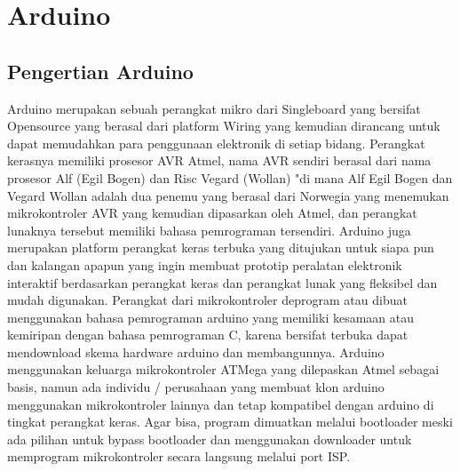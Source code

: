\section{Arduino}
\subsection{Pengertian Arduino}
Arduino merupakan sebuah perangkat mikro dari Singleboard yang bersifat Opensource yang berasal dari platform Wiring yang kemudian dirancang untuk dapat memudahkan para penggunaan elektronik di setiap bidang. Perangkat kerasnya memiliki prosesor AVR Atmel, nama AVR sendiri berasal dari nama prosesor Alf (Egil Bogen) dan Risc Vegard (Wollan) "di mana Alf Egil Bogen dan Vegard Wollan adalah dua penemu yang berasal dari Norwegia yang menemukan mikrokontroler AVR yang kemudian dipasarkan oleh Atmel, dan perangkat lunaknya tersebut memiliki bahasa pemrograman tersendiri. 
Arduino juga merupakan platform perangkat keras terbuka yang ditujukan untuk siapa pun dan kalangan apapun yang ingin membuat prototip peralatan elektronik interaktif berdasarkan perangkat keras dan perangkat lunak yang fleksibel dan mudah digunakan. Perangkat dari mikrokontroler deprogram atau dibuat menggunakan bahasa pemrograman arduino yang memiliki kesamaan atau kemiripan dengan bahasa pemrograman C, karena bersifat terbuka dapat mendownload skema hardware arduino dan membangunnya. 
Arduino menggunakan keluarga mikrokontroler ATMega yang dilepaskan Atmel sebagai basis, namun ada individu / perusahaan yang membuat klon arduino menggunakan mikrokontroler lainnya dan tetap kompatibel dengan arduino di tingkat perangkat keras. Agar bisa, program dimuatkan melalui bootloader meski ada pilihan untuk bypass bootloader dan menggunakan downloader untuk memprogram mikrokontroler secara langsung melalui port ISP.

